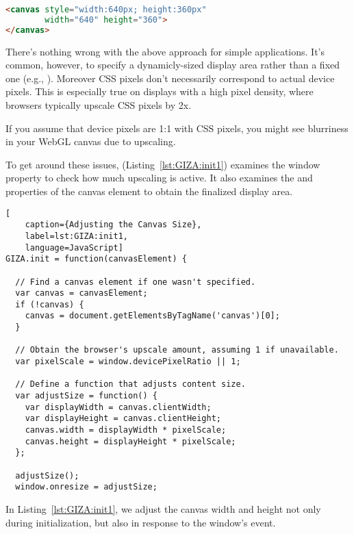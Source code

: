 \begin{lstlisting}[language=HTML]
<canvas style="width:640px; height:360px"
        width="640" height="360">
</canvas>
\end{lstlisting}

There's nothing wrong with the above approach for simple applications.  It's common, however, to specify a dynamicly-sized display area rather than a fixed one (e.g., ).  Moreover CSS pixels don't necessarily correspond to actual device pixels.  This is especially true on displays with a high pixel density, where browsers typically upscale CSS pixels by 2x.

\begin{sidenote}
If you assume that device pixels are 1:1 with CSS pixels, you might see blurriness in your WebGL canvas due to upscaling.
\end{sidenote}

To get around these issues,  (Listing~\ref{lst:GIZA:init1}) examines the  window property to check how much upscaling is active.  It also examines the   and  properties of the canvas element to obtain the finalized display area.

\begin{lstlisting}[
    caption={Adjusting the Canvas Size},
    label=lst:GIZA:init1,
    language=JavaScript]
GIZA.init = function(canvasElement) {

  // Find a canvas element if one wasn't specified.
  var canvas = canvasElement;
  if (!canvas) {
    canvas = document.getElementsByTagName('canvas')[0];
  }

  // Obtain the browser's upscale amount, assuming 1 if unavailable.
  var pixelScale = window.devicePixelRatio || 1;

  // Define a function that adjusts content size.
  var adjustSize = function() {
    var displayWidth = canvas.clientWidth;
    var displayHeight = canvas.clientHeight;
    canvas.width = displayWidth * pixelScale;
    canvas.height = displayHeight * pixelScale;
  };

  adjustSize();
  window.onresize = adjustSize;
\end{lstlisting} 

In Listing~\ref{lst:GIZA:init1}, we adjust the canvas width and height not only during initialization, but also in response to the window's   event.

